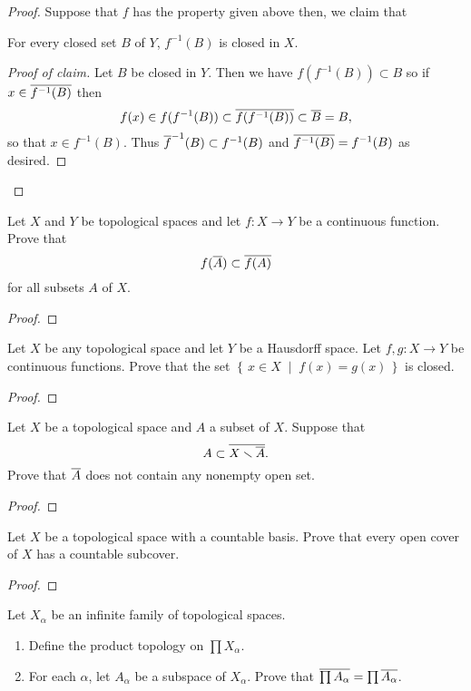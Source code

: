 \begin{proof}
Suppose that $f$ has the property given above then, we claim that
\begin{claim}
For every closed set $B$ of $Y$, $f^{-1}(B)$ is closed in $X$.
\end{claim}
\begin{proof}[Proof of claim]
\renewcommand\qedsymbol{$\clubsuit$}
Let $B$ be closed in $Y$. Then we have $f(f^{-1}(B))\subset B$ so
if $x\in\overline{f^{-1}(B)}$ then
\[
f(x)\in f(f^{-1}(B))\subset\overline{f(f^{-1}(B))}\subset\overline{B}=B,
\]
so that $x\in f^{-1}(B)$. Thus $\overline{f}^{-1}(B)\subset f^{-1}(B)$
and $\overline{f^{-1}(B)}=f^{-1}(B)$ as desired.
\end{proof}

\end{proof}
\begin{problem}
Let $X$ and $Y$ be topological spaces and let $f\colon X\to Y$ be
a continuous function. Prove that
\[
f(\overline{A})\subset\overline{f(A)}
\]
for all subsets $A$ of $X$.
\end{problem}
\begin{proof}
\end{proof}
\begin{problem}
Let $X$ be any topological space and let $Y$ be a Hausdorff
space. Let $f,g\colon X\to Y$ be continuous functions. Prove that
the set $\left\{\,x\in X\;\middle|\;f(x)=g(x)\,\right\}$ is
closed.
\end{problem}
\begin{proof}
\end{proof}
\begin{problem}
Let $X$ be a topological space and $A$ a subset of $X$. Suppose that
\[
A\subset\overline{X\smallsetminus\overline{A}}.
\]
Prove that $\overline{A}$ does not contain any nonempty open set.
\end{problem}
\begin{proof}
\end{proof}
\begin{problem}
Let $X$ be a topological space with a countable basis. Prove that
every open cover of $X$ has a countable subcover.
\end{problem}
\begin{proof}
\end{proof}
\begin{problem}
Let $X_\alpha$ be an infinite family of topological spaces.
\begin{enumerate}[noitemsep,label=(\alph*)]
\item Define the product topology on $\prod X_\alpha$.
\item For each $\alpha$, let $A_\alpha$ be a subspace of
  $X_\alpha$. Prove that $\overline{\prod
    A_\alpha}=\prod\overline{A_\alpha}$.
\end{enumerate}
\end{problem}
